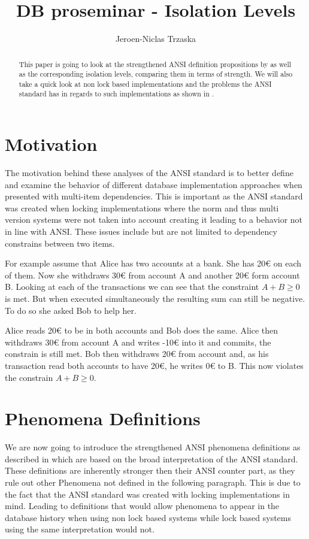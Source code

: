 \documentclass[sigconf, review=true]{acmart}
\author{Jeroen-Niclas Trzaska}
\title{DB proseminar - Isolation Levels}
\affiliation{%
   \institution{TU Dresden}
   \city{Dresden}
   \state{Saxony}
   \country{Germany}}
\begin{document}
\begin{abstract}
    This paper is going to look at the strengthened ANSI definition propositions by \cite{Adya_Liskov_O_Neil_2000} as well as the corresponding isolation levels,
    comparing them in terms of strength. We will also take a quick look at non lock based implementations
    and the problems the ANSI standard has in regards to such implementations as shown in \cite{Berenson_Bernstein_Gray_Melton_O_Neil_O_Neil_1995}.
\end{abstract}
\maketitle

\section{Motivation}
The motivation behind these analyses of the ANSI standard is to better define and examine the
behavior of different database implementation approaches when presented with multi-item dependencies.
This is important as the ANSI standard was created when locking implementations where the norm and thus multi version systems were not
taken into account creating it leading to a behavior not in line with ANSI.
These issues include but are not limited to dependency constrains between two items.

For example assume that Alice has two accounts at a bank. She has 20€ on each of them. Now she withdraws 30€ from account A and another 20€ form account B.
Looking at each of the transactions we can see that the constraint $A+B \geq 0$ is met.
But when executed simultaneously the resulting sum can still be negative. To do so
she asked Bob to help her.
\begin{example}
    Alice reads 20€ to be in both accounts and Bob does the same. Alice then withdraws 30€ from account A and writes -10€ into it and commits, the constrain is still met.
    Bob then withdraws 20€ from account and, as his transaction read both accounts to have 20€, he writes 0€  to B. This now violates the constrain $A+B \geq 0$.
\end{example}
\section{Phenomena Definitions}
We are now going to introduce the strengthened ANSI phenomena definitions as described in \cite{Adya_Liskov_O_Neil_2000}  which
are based on the broad interpretation of the ANSI standard. These definitions are inherently stronger then their ANSI counter part,
as they rule out other Phenomena not defined in the following paragraph. This is due to the fact that the ANSI standard
was created with locking implementations in mind. Leading to definitions that would allow phenomena to appear in the database history when using non lock based systems
while lock based systems using the same interpretation would not.
\end{document}
